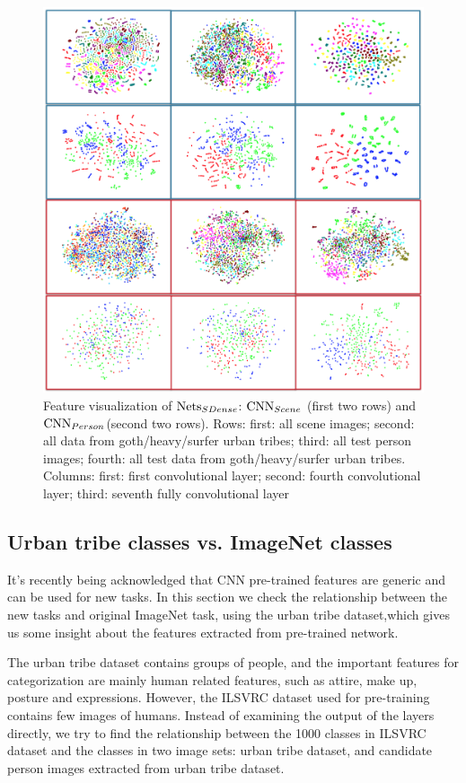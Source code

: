 \documentclass[10pt,twocolumn,letterpaper]{article}
\begin{document}
\begin{figure}[!t]
\begin{center}
\includegraphics[width=0.8\linewidth]{tsne}
\end{center}
\caption{Feature visualization of  $\textup{Nets}_{SDense}$: $\textup{CNN}_{Scene}$ (first two rows) and $\textup{CNN}_{Person}$(second two rows). Rows: first: all scene images; second: all data from goth/heavy/surfer urban tribes; third: all test person images; fourth: all test data from goth/heavy/surfer urban tribes. Columns:  first: first convolutional layer; second: fourth convolutional layer; third: seventh fully convolutional layer}
\label{tsne}
\end{figure}

\subsection{Urban tribe classes vs. ImageNet classes }
It's recently being acknowledged that CNN pre-trained features are generic and can be used for new tasks. In this section we check the relationship between the new tasks and original ImageNet task, using the urban tribe dataset,which gives us some insight about the features extracted from pre-trained network.

The urban tribe dataset contains groups of people, and the important features for categorization are mainly human related features, such as attire, make up, posture and expressions. However, the ILSVRC dataset used for pre-training contains few images of humans. Instead of examining the output of the layers directly, we try to find the relationship between the 1000 classes in ILSVRC dataset and the classes in two image sets: urban tribe dataset, and  candidate person images extracted from urban tribe dataset.
\end{document}
